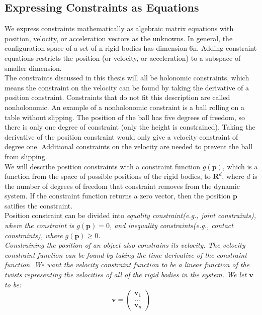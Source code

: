     \subsection{Expressing Constraints as Equations}
        We express constraints mathematically as algebraic matrix equations with position, velocity, or acceleration vectors as the unknowns. In general, the configuration space of a set of n rigid bodies has dimension 6n. Adding constraint equations restricts the position (or velocity, or acceleration) to a subspace of smaller dimension.\\
        The constraints discussed in this thesis will all be holonomic constraints, which means the constraint on the velocity can be found by taking the derivative of a position constraint. Constraints that do not fit this description are called nonholonomic. An example of a nonholonomic constraint is a ball rolling on a table without slipping. The position of the ball has five degrees of freedom, so there is only one degree of constraint (only the height is constrained). Taking the derivative of the position constraint would only give a velocity constraint of degree one. Additional constraints on the velocity are needed to prevent the ball from slipping.\\
        We will describe position constraints with a constraint function $g(\mathbf{p})$, which is a function from the space of possible positions of the rigid bodies, to $\mathbf{R}^d$, where $d$ is the number of degrees of freedom that constraint removes from the dynamic system. If the constraint function returns a zero vector, then the position $\mathbf{p}$ satifies the constraint. \\
        Position constraint can be divided into \slshape{equality constraint}(e.g., joint constraints), where the constraint is $g(\mathbf{p}) = 0$, and \slshape{inequality constraints}(e.g., contact constraints), where $g(\mathbf{p}) \ge 0$. \\
        Constraining the position of an object also constrains its velocity. The velocity constraint function can be found by taking the time derivative of the constraint function. We want the velocity constraint function to be a linear function of the twists representing the velocities of all of the rigid bodies in the system. We let $\pmb{v}$ to be:
        \begin{equation}
            \pmb{v} = \left( \begin{array}{c}\pmb{v}_1 \\ ... \\ \pmb{v}_n \end{array}\right)
        \end{equation}
